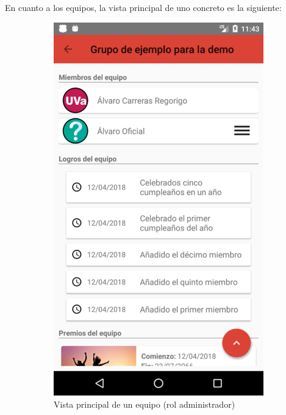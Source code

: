 \documentclass[twoside]{report}
\begin{document}
En cuanto a los equipos, la vista principal de uno concreto es la siguiente:
\begin{figure}[H]
\begin{center}
	\begin{subfigure}[t]{.3\linewidth}
		\includegraphics[scale=0.2]{images/userguide/14.png}
		\caption{Vista principal de un equipo (rol administrador)}
	\end{subfigure}\hspace{2mm}%
	\begin{subfigure}[t]{.3\linewidth}

\end{subfigure}
\end{center}
\end{figure}
\end{document}
